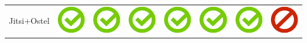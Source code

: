 \documentclass[10pt,foldmark,tumble]{leaflet}
\begin{document}
{\begin{tabular}{ L{2cm} | C{2cm} | C{2cm} | C{2cm} | C{2cm} | C{2cm} | C{2cm} | C{2cm} | }
Jitsi+Ostel  & \includegraphics[scale=0.1]{pics/haken.png} & \includegraphics[scale=0.1]{pics/haken.png} & \includegraphics[scale=0.1]{pics/haken.png} & \includegraphics[scale=0.1]{pics/haken.png} & \includegraphics[scale=0.1]{pics/haken.png} & \includegraphics[scale=0.1]{pics/haken.png} & \includegraphics[scale=0.1]{pics/nohaken.png} \tabularnewline

\end{tabular}}
\end{document}
